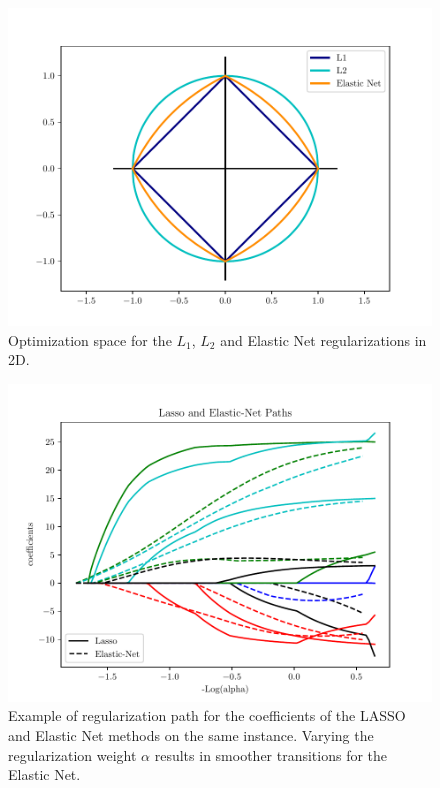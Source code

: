 \begin{figure}
  \caption{Optimization space for the $L_1$, $L_2$ and Elastic Net regularizations in 2D.}
  \centering
    \includegraphics[width=1\textwidth]{Figures/reg_norms.pdf}
\end{figure}

\begin{figure}
  \caption{Example of regularization path for the coefficients of the LASSO and Elastic Net methods on the same instance. Varying the regularization weight $\alpha$ results in smoother transitions for the Elastic Net.}
  \centering
    \includegraphics[width=1\textwidth]{Figures/enet_vs_lasso.pdf}
\end{figure}

